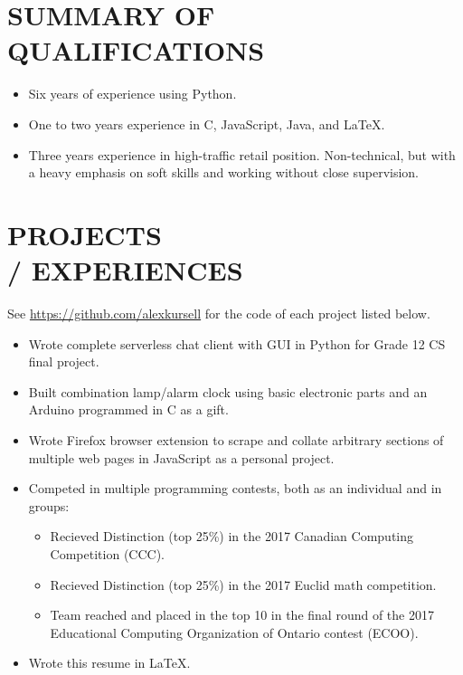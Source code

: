 \documentclass[11pt, margin]{res}
\begin{document}
\begin{resume}
 

\section{SUMMARY OF \\ QUALIFICATIONS}   \begin{itemize}[leftmargin=*, itemsep=-2pt]
                        \item Six years of experience using Python.
                        \item One to two years experience in C, JavaScript, Java, and LaTeX.
                        \item Three years experience in high-traffic retail position. Non-technical, but with a heavy emphasis on soft skills and working without close supervision.
                    \end{itemize}

\section{PROJECTS \\ / EXPERIENCES}
            See \url{https://github.com/alexkursell} for the code of each project listed below.

            \begin{itemize}[leftmargin=*, itemsep=-2pt]
                \item Wrote complete serverless chat client with GUI in Python for Grade 12 CS final project.
                \item Built combination lamp/alarm clock using basic electronic parts and an Arduino programmed in C as a gift.
                \item Wrote Firefox browser extension to scrape and collate arbitrary sections of multiple web pages in JavaScript as a personal project.
                \item Competed in multiple programming contests, both as an individual and in groups:
                \begin{itemize}[itemsep=-2pt]
                    \item Recieved Distinction (top 25\%) in the 2017 Canadian Computing Competition (CCC).
                    \item Recieved Distinction (top 25\%) in the 2017 Euclid math competition.
                    \item Team reached and placed in the top 10 in the final round of the 2017 Educational Computing Organization of Ontario contest (ECOO).
                \end{itemize}
                \item Wrote this resume in LaTeX.
            \end{itemize}



\end{resume}
\end{document}
